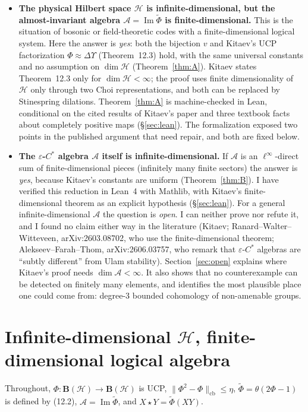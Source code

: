 \documentclass[11pt]{article}
\theoremstyle{remark}
\newcommand{\eps}{\varepsilon}
\newcommand{\cA}{\mathcal{A}}
\newcommand{\cH}{\mathcal{H}}
\newcommand{\Bo}{\mathbf{B}}
\newcommand{\cb}{\mathrm{cb}}
\newcommand{\Img}{\operatorname{Im}}
\newcommand{\wt}{\widetilde}
\begin{document}
\begin{itemize}
\item[(a)] \textbf{The physical Hilbert space $\cH$ is infinite-dimensional, but the almost-invariant algebra $\cA=\Img\wt\Phi$ is finite-dimensional.} This is the situation of bosonic or field-theoretic codes with a finite-dimensional logical system. Here the answer is \emph{yes}: both the bijection $v$ and Kitaev's UCP factorization $\Phi\approx\Delta\Upsilon$ (Theorem~12.3) hold, with the same universal constants and no assumption on $\dim\cH$ (Theorem~\ref{thm:A}). Kitaev states Theorem~12.3 only for $\dim\cH<\infty$; the proof uses finite dimensionality of $\cH$ only through two Choi representations, and both can be replaced by Stinespring dilations. Theorem~\ref{thm:A} is machine-checked in Lean, conditional on the cited results of Kitaev's paper and three textbook facts about completely positive maps (\S\ref{sec:lean}). The formalization exposed two points in the published argument that need repair, and both are fixed below.
\item[(b)] \textbf{The $\eps$-$C^*$ algebra $\cA$ itself is infinite-dimensional.} If $\cA$ is an $\ell^\infty$-direct sum of finite-dimensional pieces (infinitely many finite sectors) the answer is \emph{yes}, because Kitaev's constants are uniform (Theorem~\ref{thm:B}). I have verified this reduction in Lean~4 with Mathlib, with Kitaev's finite-dimensional theorem as an explicit hypothesis (\S\ref{sec:lean}). For a general infinite-dimensional $\cA$ the question is \emph{open}. I can neither prove nor refute it, and I found no claim either way in the literature (Kitaev; Ranard--Walter--Witteveen, arXiv:2603.08702, who use the finite-dimensional theorem; Alekseev--Farah--Thom, arXiv:2606.03757, who remark that $\eps$-$C^*$ algebras are ``subtly different'' from Ulam stability). Section~\ref{sec:open} explains where Kitaev's proof needs $\dim\cA<\infty$. It also shows that no counterexample can be detected on finitely many elements, and identifies the most plausible place one could come from: degree-3 bounded cohomology of non-amenable groups.
\end{itemize}

\section{Infinite-dimensional $\cH$, finite-dimensional logical algebra}

Throughout, $\Phi\colon\Bo(\cH)\to\Bo(\cH)$ is UCP, $\|\Phi^2-\Phi\|_\cb\le\eta$, $\wt\Phi=\theta(2\Phi-1)$ is defined by (12.2), $\cA=\Img\wt\Phi$, and $X\star Y=\wt\Phi(XY)$.
\end{document}
